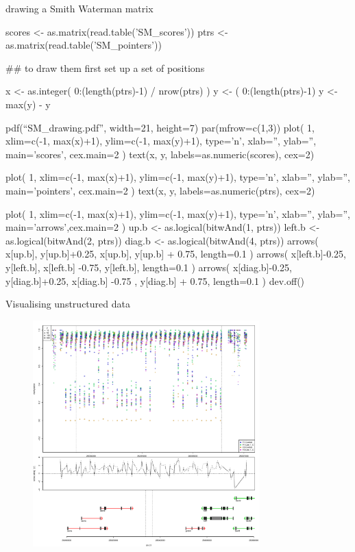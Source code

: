 \documentclass[pdf]{beamer}
\begin{document}
\begin{frame}[fragile]{drawing a Smith Waterman matrix}
  \begin{rcode}
    scores <- as.matrix(read.table('SM_scores'))
    ptrs <- as.matrix(read.table('SM_pointers'))
    
    ## to draw them first set up a set of positions                                                                          
    
    x <- as.integer( 0:(length(ptrs)-1) / nrow(ptrs) )
    y <- ( 0:(length(ptrs)-1) %
    y <- max(y) - y
    
    pdf(``SM_drawing.pdf'', width=21, height=7)
    par(mfrow=c(1,3))
    plot( 1, xlim=c(-1, max(x)+1), ylim=c(-1, max(y)+1),
    type='n', xlab='', ylab='', main='scores', cex.main=2 )
    text(x, y, labels=as.numeric(scores), cex=2)
    
    plot( 1, xlim=c(-1, max(x)+1), ylim=c(-1, max(y)+1),
    type='n', xlab='', ylab='', main='pointers', cex.main=2 )
    text(x, y, labels=as.numeric(ptrs), cex=2) 
    
    plot( 1, xlim=c(-1, max(x)+1), ylim=c(-1, max(y)+1),
    type='n', xlab='', ylab='', main='arrows',cex.main=2 )
    up.b <- as.logical(bitwAnd(1, ptrs))
    left.b <- as.logical(bitwAnd(2, ptrs))
    diag.b <- as.logical(bitwAnd(4, ptrs))
    arrows( x[up.b], y[up.b]+0.25, x[up.b], y[up.b] + 0.75, length=0.1 )
    arrows( x[left.b]-0.25, y[left.b], x[left.b] -0.75, y[left.b], length=0.1 )
    arrows( x[diag.b]-0.25, y[diag.b]+0.25, x[diag.b] -0.75 , y[diag.b] + 0.75,
    length=0.1 )
    dev.off()
  \end{rcode}
\end{frame}

\begin{frame}{Visualising unstructured data}
  \begin{figure}[ht]
    \includegraphics[width=0.78\textwidth]{images/genome_plot.pdf}
  \end{figure}
  
\end{frame}
\end{document}
